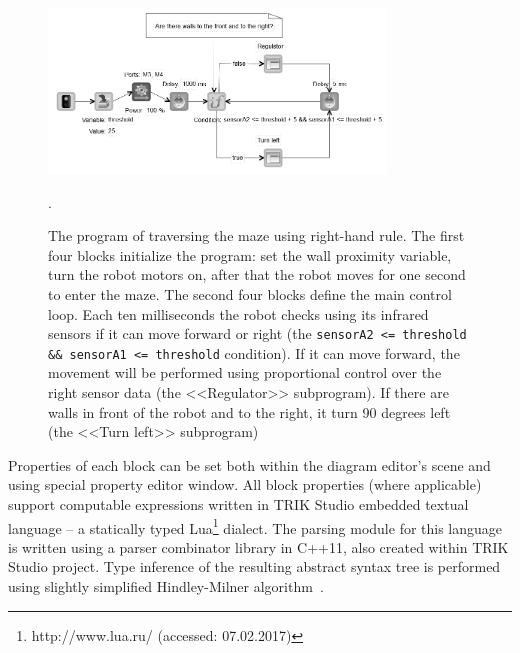 \documentclass[conference]{IEEEtran}
\begin{document}
\begin{figure}[ht]
    \centering
    \includegraphics[width=0.8\textwidth]{TS_CF_Labyrinth_Diagram.png}
    \caption{The program of traversing the maze using right-hand rule. The first four blocks initialize the program: set the wall proximity variable, turn the robot motors on, after that the robot moves for one second to enter the maze. The second four blocks define the main control loop. Each ten milliseconds the robot checks using its infrared sensors if it can move forward or right (the \texttt{sensorA2 <= threshold \&\& sensorA1 <= threshold} condition). If it can move forward, the movement will be performed using proportional control over the right sensor data (the <<Regulator>> subprogram). If there are walls in front of the robot and to the right, it turn 90 degrees left (the <<Turn left>> subprogram)}.
    \label{image:TS_CF_Example}
\end{figure}

Properties of each block can be set both within the diagram editor's scene and using special property editor window. All block properties (where applicable) support computable expressions written in TRIK Studio embedded textual language -- a statically typed Lua\footnote{http://www.lua.ru/ (accessed: 07.02.2017)} dialect. The parsing module for this language is written using a parser combinator library in C++11, also created within TRIK Studio project. Type inference of the resulting abstract syntax tree is performed using slightly simplified Hindley-Milner algorithm~\cite{damas1982principal}.
\end{document}
